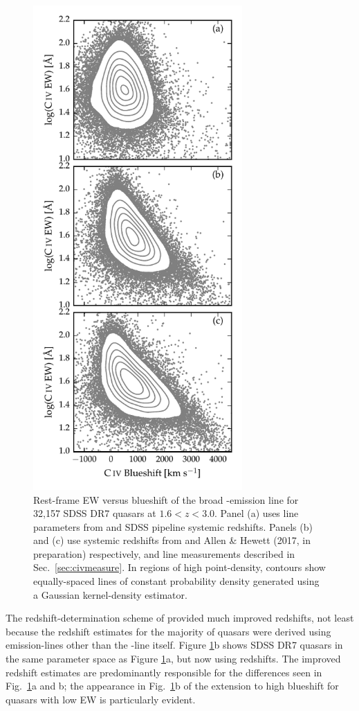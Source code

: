 \begin{figure}
    \centering 
    \includegraphics[width=8cm]{figures/chapter03/civ_space_z_compare.pdf}
    \caption{Rest-frame EW versus blueshift of the broad -emission line for 32,157 SDSS DR7 quasars at $1.6 < z < 3.0$. Panel (a) uses  line parameters from \citet{shen11} and SDSS pipeline systemic redshifts. Panels (b) and (c) use systemic redshifts from \citet{hewett10} and Allen \& Hewett (2017, in preparation) respectively, and  line measurements described in Sec.~\ref{sec:civmeasure}. In regions of high point-density, contours show equally-spaced lines of constant probability density generated using a Gaussian kernel-density estimator.} 
    \label{fig:civ_space}
\end{figure}

The redshift-determination scheme of \citet{hewett10} provided much improved redshifts, not least because the redshift estimates for the majority of quasars were derived using emission-lines other than the -line itself. 
Figure \ref{fig:civ_space}b shows SDSS DR7 quasars in the same  parameter space as Figure \ref{fig:civ_space}a, but now using \citet{hewett10} redshifts. 
The improved redshift estimates are predominantly responsible for the differences seen in Fig.~\ref{fig:civ_space}a and b; the appearance in Fig.~\ref{fig:civ_space}b of the extension to high blueshift for quasars with low  EW is particularly evident.

